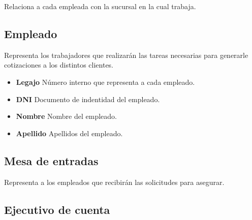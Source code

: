 \documentclass[a4paper,11pt]{article}
\begin{document}
Relaciona a cada empleada con la sucursal en la cual trabaja.

\subsection{Empleado}

Representa los trabajadores que realizarán las tareas necesarias para generarle cotizaciones
a los distintos clientes.

\begin{itemize}
   
  \item \textbf{Legajo} Número interno que representa a cada empleado.
  
  \item \textbf{DNI} Documento de indentidad del empleado.
  
  \item \textbf{Nombre} Nombre del empleado.
  
  \item \textbf{Apellido} Apellidos del empleado.
  
\end{itemize}



   
  
  

\subsection{Mesa de entradas}

Representa a los empleados que recibirán las solicitudes para asegurar.

\subsection{Ejecutivo de cuenta}
\end{document}
